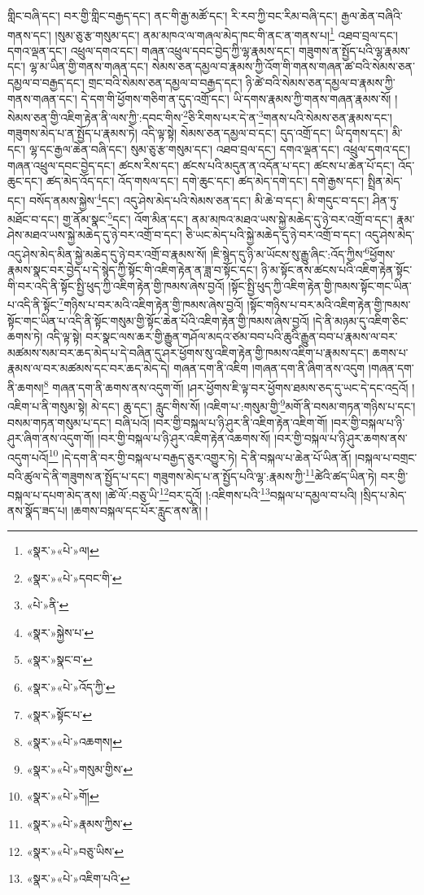 གླིང་བཞི་དང་། བར་གྱི་གླིང་བརྒྱད་དང་། ནང་གི་རྒྱ་མཚོ་དང་། རི་རབ་ཀྱི་བང་རིམ་བཞི་དང་། རྒྱལ་ཆེན་བཞིའི་གནས་དང་། །སུམ་ཅུ་རྩ་གསུམ་དང་། ནམ་མཁའ་ལ་གཞལ་མེད་ཁང་གི་ནང་ན་གནས་པ།\footnote{«སྣར་»«པེ་»ལ།} འཐབ་བྲལ་དང་། དགའ་ལྡན་དང་། འཕྲུལ་དགའ་དང་། གཞན་འཕྲུལ་དབང་བྱེད་ཀྱི་ལྷ་རྣམས་དང་། གཟུགས་ན་སྤྱོད་པའི་ལྷ་རྣམས་དང་། ལྷ་མ་ཡིན་གྱི་གནས་གཞན་དང་། སེམས་ཅན་དམྱལ་བ་རྣམས་ཀྱི་འོག་གི་གནས་གཞན་ཚ་བའི་སེམས་ཅན་དམྱལ་བ་བརྒྱད་དང་། གྲང་བའི་སེམས་ཅན་དམྱལ་བ་བརྒྱད་དང་། ཉི་ཚེ་བའི་སེམས་ཅན་དམྱལ་བ་རྣམས་ཀྱི་གནས་གཞན་དང་། དེ་དག་གི་ཕྱོགས་གཅིག་ན་དུད་འགྲོ་དང་། ཡི་དགས་རྣམས་ཀྱི་གནས་གཞན་རྣམས་སོ། །སེམས་ཅན་གྱི་འཇིག་རྟེན་ནི་ལས་ཀྱི་:དབང་གིས་\footnote{«སྣར་»«པེ་»དབང་གི་}ཅི་རིགས་པར་དེ་ན་\footnote{«པེ་»ནི་}གནས་པའི་སེམས་ཅན་རྣམས་དང་། གཟུགས་མེད་པ་ན་སྤྱོད་པ་རྣམས་ཏེ། འདི་ལྟ་སྟེ། སེམས་ཅན་དམྱལ་བ་དང་། དུད་འགྲོ་དང་། ཡི་དྭགས་དང་། མི་དང་། ལྷ་དང་རྒྱལ་ཆེན་བཞི་དང་། སུམ་ཅུ་རྩ་གསུམ་དང་། འཐབ་བྲལ་དང་། དགའ་ལྡན་དང་། འཕྲུལ་དགའ་དང་། གཞན་འཕྲུལ་དབང་བྱེད་དང་། ཚངས་རིས་དང་། ཚངས་པའི་མདུན་ན་འདོན་པ་དང་། ཚངས་པ་ཆེན་པོ་དང་། འོད་ཆུང་དང་། ཚད་མེད་འོད་དང་། འོད་གསལ་དང་། དགེ་ཆུང་དང་། ཚད་མེད་དགེ་དང་། དགེ་རྒྱས་དང་། སྤྲིན་མེད་དང་། བསོད་ནམས་སྐྱེས་\footnote{«སྣར་»སྐྱེས་པ་}དང་། འདུ་ཤེས་མེད་པའི་སེམས་ཅན་དང་། མི་ཆེ་བ་དང་། མི་གདུང་བ་དང་། ཤིན་ཏུ་མཐོང་བ་དང་། གྱ་ནོམ་སྣང་\footnote{«སྣར་»སྣང་བ་}དང་། འོག་མིན་དང་། ནམ་མཁའ་མཐའ་ཡས་སྐྱེ་མཆེད་དུ་ཉེ་བར་འགྲོ་བ་དང་། རྣམ་ཤེས་མཐའ་ཡས་སྐྱེ་མཆེད་དུ་ཉེ་བར་འགྲོ་བ་དང་། ཅི་ཡང་མེད་པའི་སྐྱེ་མཆེད་དུ་ཉེ་བར་འགྲོ་བ་དང་། འདུ་ཤེས་མེད་འདུ་ཤེས་མེད་མིན་སྐྱེ་མཆེད་དུ་ཉེ་བར་འགྲོ་བ་རྣམས་སོ། །ཇི་སྙེད་དུ་ཉི་མ་ཡོངས་སུ་རྒྱུ་ཞིང་:འོད་ཀྱིས་\footnote{«སྣར་»«པེ་»འོད་ཀྱི་}ཕྱོགས་རྣམས་སྣང་བར་བྱེད་པ་དེ་སྙེད་ཀྱི་སྟོང་གི་འཇིག་རྟེན་ན་ཟླ་བ་སྟོང་དང་། ཉི་མ་སྟོང་ནས་ཚངས་པའི་འཇིག་རྟེན་སྟོང་གི་བར་འདི་ནི་སྟོང་སྤྱི་ཕུད་ཀྱི་འཇིག་རྟེན་གྱི་ཁམས་ཞེས་བྱའོ། །སྟོང་སྤྱི་ཕུད་ཀྱི་འཇིག་རྟེན་གྱི་ཁམས་སྟོང་གང་ཡིན་པ་འདི་ནི་སྟོང་\footnote{«སྣར་»སྟོང་པ་}གཉིས་པ་བར་མའི་འཇིག་རྟེན་གྱི་ཁམས་ཞེས་བྱའོ། །སྟོང་གཉིས་པ་བར་མའི་འཇིག་རྟེན་གྱི་ཁམས་སྟོང་གང་ཡིན་པ་འདི་ནི་སྟོང་གསུམ་གྱི་སྟོང་ཆེན་པོའི་འཇིག་རྟེན་གྱི་ཁམས་ཞེས་བྱའོ། །དེ་ནི་མཉམ་དུ་འཇིག་ཅིང་ཆགས་ཏེ། འདི་ལྟ་སྟེ། བར་སྣང་ལས་ཆར་གྱི་རྒྱུན་གཤོལ་མདའ་ཙམ་བབ་པའི་ཆུའི་རྒྱུན་བབ་པ་རྣམས་ལ་བར་མཚམས་སམ་བར་ཆད་མེད་པ་དེ་བཞིན་དུ་ཤར་ཕྱོགས་སུ་འཇིག་རྟེན་གྱི་ཁམས་འཇིག་པ་རྣམས་དང་། ཆགས་པ་རྣམས་ལ་བར་མཚམས་དང་བར་ཆད་མེད་དེ། གཞན་དག་ནི་འཇིག །གཞན་དག་ནི་ཞིག་ནས་འདུག །གཞན་དག་ནི་ཆགས།\footnote{«སྣར་»«པེ་»འཆགས།} གཞན་དག་ནི་ཆགས་ནས་འདུག་གོ། །ཤར་ཕྱོགས་ཇི་ལྟ་བར་ཕྱོགས་ཐམས་ཅད་དུ་ཡང་དེ་དང་འདྲའོ། །འཇིག་པ་ནི་གསུམ་སྟེ། མེ་དང་། ཆུ་དང་། རླུང་གིས་སོ། །འཇིག་པ་:གསུམ་གྱི་\footnote{«སྣར་»«པེ་»གསུམ་གྱིས་}མགོ་ནི་བསམ་གཏན་གཉིས་པ་དང་། བསམ་གཏན་གསུམ་པ་དང་། བཞི་པའོ། །བར་གྱི་བསྐལ་པ་ཉི་ཤུར་ནི་འཇིག་རྟེན་འཇིག་གོ། །བར་གྱི་བསྐལ་པ་ཉི་ཤུར་ཞིག་ནས་འདུག་གོ། །བར་གྱི་བསྐལ་པ་ཉི་ཤུར་འཇིག་རྟེན་འཆགས་སོ། །བར་གྱི་བསྐལ་པ་ཉི་ཤུར་ཆགས་ནས་འདུག་པའོ།\footnote{«སྣར་»«པེ་»གོ།} །དེ་དག་ནི་བར་གྱི་བསྐལ་པ་བརྒྱད་ཅུར་འགྱུར་ཏེ། དེ་ནི་བསྐལ་པ་ཆེན་པོ་ཡིན་ནོ། །བསྐལ་པ་བགྲང་བའི་ཚུལ་དེ་ནི་གཟུགས་ན་སྤྱོད་པ་དང་། གཟུགས་མེད་པ་ན་སྤྱོད་པའི་ལྷ་:རྣམས་ཀྱི་\footnote{«སྣར་»«པེ་»རྣམས་ཀྱིས་}ཚེའི་ཚད་ཡིན་ཏེ། བར་གྱི་བསྐལ་པ་དཔག་མེད་ནས། །ཚེ་ལོ་:བཅུ་ཡི་\footnote{«སྣར་»«པེ་»བཅུ་ཡིས་}བར་དུའོ། །:འཇིགས་པའི་\footnote{«སྣར་»«པེ་»འཇིག་པའི་}བསྐལ་པ་དམྱལ་བ་པའི། །སྲིད་པ་མེད་ནས་སྣོད་ཟད་པ། །ཆགས་བསྐལ་དང་པོར་རླུང་ནས་ནི། །

